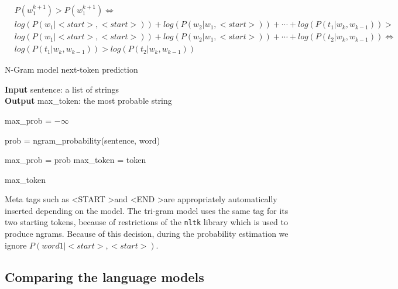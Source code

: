 \documentclass[11pt, a4paper]{article}
\begin{document}
	\begin{equation}
		\label{eq::trigram_sentence_probs}
		\begin{aligned}
			& P(w^{k+1}_1) > P(w^{k+1}_1) \iff \\
			& log(P(w_1|<start>, <start>)) + log(P(w_2|w_1, <start>)) + \cdots + log(P(t_1|w_k, w_{k-1})) > \\ 
			& log(P(w_1|<start>, <start>)) + log(P(w_2|w_1, <start>)) + \cdots + log(P(t_2|w_k, w_{k-1})) \iff \\
			& log(P(t_1|w_k, w_{k-1})) > log(P(t_2|w_k, w_{k-1}))
		\end{aligned}
	\end{equation}
	
	
	
	\begin{algorithm}
		\caption{N-Gram model next-token prediction} 
		\label{al::next_token}
		
		\hspace*{\algorithmicindent} \textbf{Input} sentence: a list of strings\\
		\hspace*{\algorithmicindent} \textbf{Output} max\_token: the most probable string
		\begin{algorithmic}[1]
			
			\State max\_prob = $-\infty$
			
			
					\State prob = ngram\_probability(sentence, word)
					
						\State max\_prob = prob
						\State max\_token = token
					\EndIf
				
				\EndIf
			
			\EndFor
			
			\State \Return max\_token
		\end{algorithmic} 
	\end{algorithm}
	
	
	Meta tags such as \textless START \textgreater  and \textless END \textgreater  are appropriately automatically inserted depending on the model. The tri-gram model uses the same tag for its two starting tokens, because of restrictions of the \texttt{nltk} library which is used to produce ngrams. Because of this decision, during the probability estimation we ignore $P(word1 | <start>, <start>)$.
	
	
	\subsection{Comparing the language models}
	
\end{document}
